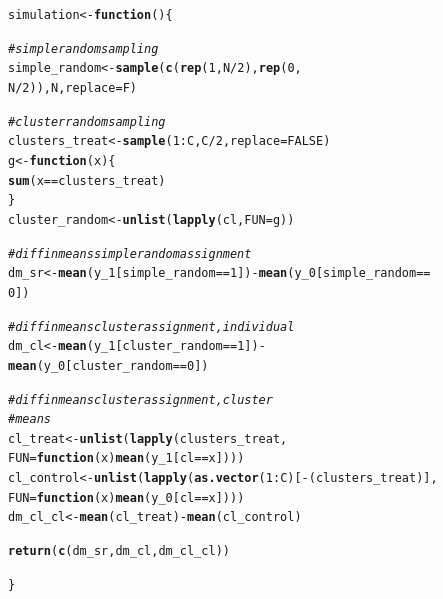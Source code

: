 \documentclass[12 pt]{article}\usepackage[]{graphicx}\usepackage[]{color}
\makeatletter
\newcommand{\hlnum}[1]{\textcolor[rgb]{0.686,0.059,0.569}{#1}}%
\newcommand{\hlcom}[1]{\textcolor[rgb]{0.678,0.584,0.686}{\textit{#1}}}%
\newcommand{\hlopt}[1]{\textcolor[rgb]{0,0,0}{#1}}%
\newcommand{\hlstd}[1]{\textcolor[rgb]{0.345,0.345,0.345}{#1}}%
\newcommand{\hlkwa}[1]{\textcolor[rgb]{0.161,0.373,0.58}{\textbf{#1}}}%
\newcommand{\hlkwb}[1]{\textcolor[rgb]{0.69,0.353,0.396}{#1}}%
\newcommand{\hlkwc}[1]{\textcolor[rgb]{0.333,0.667,0.333}{#1}}%
\newcommand{\hlkwd}[1]{\textcolor[rgb]{0.737,0.353,0.396}{\textbf{#1}}}%
\newenvironment{kframe}{%
 \def\at@end@of@kframe{}%
 \ifinner\ifhmode%
  \def\at@end@of@kframe{\end{minipage}}%
  \begin{minipage}{\columnwidth}%
 \fi\fi%
 \def\FrameCommand##1{\hskip\@totalleftmargin \hskip-\fboxsep
 \colorbox{shadecolor}{##1}\hskip-\fboxsep
     \hskip-\linewidth \hskip-\@totalleftmargin \hskip\columnwidth}%
 \MakeFramed {\advance\hsize-\width
   \@totalleftmargin\z@ \linewidth\hsize
   \@setminipage}}%
 {\par\unskip\endMakeFramed%
 \at@end@of@kframe}
\newenvironment{knitrout}{}{} %
\makeatother
\begin{document}
\begin{knitrout}
\color{fgcolor}\begin{kframe}
\begin{alltt}
\hlstd{simulation} \hlkwb{<-} \hlkwa{function}\hlstd{() \{}

    \hlcom{# simple random sampling}
    \hlstd{simple_random} \hlkwb{<-} \hlkwd{sample}\hlstd{(}\hlkwd{c}\hlstd{(}\hlkwd{rep}\hlstd{(}\hlnum{1}\hlstd{, N}\hlopt{/}\hlnum{2}\hlstd{),} \hlkwd{rep}\hlstd{(}\hlnum{0}\hlstd{,}
        \hlstd{N}\hlopt{/}\hlnum{2}\hlstd{)), N,} \hlkwc{replace} \hlstd{= F)}

    \hlcom{# cluster random sampling}
    \hlstd{clusters_treat} \hlkwb{<-} \hlkwd{sample}\hlstd{(}\hlnum{1}\hlopt{:}\hlstd{C, C}\hlopt{/}\hlnum{2}\hlstd{,} \hlkwc{replace} \hlstd{=} \hlnum{FALSE}\hlstd{)}
    \hlstd{g} \hlkwb{<-} \hlkwa{function}\hlstd{(}\hlkwc{x}\hlstd{) \{}
        \hlkwd{sum}\hlstd{(x} \hlopt{==} \hlstd{clusters_treat)}
    \hlstd{\}}
    \hlstd{cluster_random} \hlkwb{<-} \hlkwd{unlist}\hlstd{(}\hlkwd{lapply}\hlstd{(cl,} \hlkwc{FUN} \hlstd{= g))}

    \hlcom{# diff in means simple random assignment}
    \hlstd{dm_sr} \hlkwb{<-} \hlkwd{mean}\hlstd{(y_1[simple_random} \hlopt{==} \hlnum{1}\hlstd{])} \hlopt{-} \hlkwd{mean}\hlstd{(y_0[simple_random} \hlopt{==}
        \hlnum{0}\hlstd{])}

    \hlcom{# diff in means cluster assignment, individual}
    \hlstd{dm_cl} \hlkwb{<-} \hlkwd{mean}\hlstd{(y_1[cluster_random} \hlopt{==} \hlnum{1}\hlstd{])} \hlopt{-}
        \hlkwd{mean}\hlstd{(y_0[cluster_random} \hlopt{==} \hlnum{0}\hlstd{])}

    \hlcom{# diff in means cluster assignment, cluster}
    \hlcom{# means}
    \hlstd{cl_treat} \hlkwb{<-} \hlkwd{unlist}\hlstd{(}\hlkwd{lapply}\hlstd{(clusters_treat,}
        \hlkwc{FUN} \hlstd{=} \hlkwa{function}\hlstd{(}\hlkwc{x}\hlstd{)} \hlkwd{mean}\hlstd{(y_1[cl} \hlopt{==} \hlstd{x])))}
    \hlstd{cl_control} \hlkwb{<-} \hlkwd{unlist}\hlstd{(}\hlkwd{lapply}\hlstd{(}\hlkwd{as.vector}\hlstd{(}\hlnum{1}\hlopt{:}\hlstd{C)[}\hlopt{-}\hlstd{(clusters_treat)],}
        \hlkwc{FUN} \hlstd{=} \hlkwa{function}\hlstd{(}\hlkwc{x}\hlstd{)} \hlkwd{mean}\hlstd{(y_0[cl} \hlopt{==} \hlstd{x])))}
    \hlstd{dm_cl_cl} \hlkwb{<-} \hlkwd{mean}\hlstd{(cl_treat)} \hlopt{-} \hlkwd{mean}\hlstd{(cl_control)}

    \hlkwd{return}\hlstd{(}\hlkwd{c}\hlstd{(dm_sr, dm_cl, dm_cl_cl))}

\hlstd{\}}
\end{alltt}
\end{kframe}
\end{knitrout}
\end{document}
